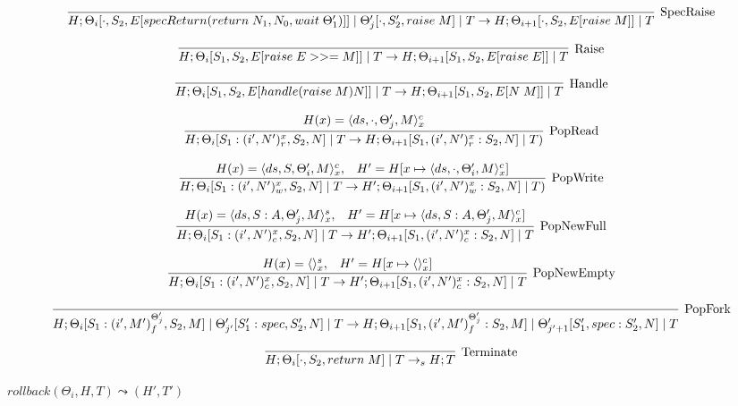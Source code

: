 \documentclass[9pt]{article}
\newcommand\specStep{\rightarrow_{s}}
\newcommand{\eval}[1]{E[#1]}
\begin{document}
\[%
\infer[\text{SpecRaise}]{H; \Theta_i[\cdot, S_2, \eval{specReturn(return \; N_1, N_0, wait \; \Theta_1')}] \; | \; \Theta_j'[\cdot, S_2', raise \; M] \; | \; T \rightarrow H; \Theta_{i+1}[\cdot, S_2, \eval{raise \; M}] \; | \; T}{}
\]

\[%
\infer[\text{Raise}]{H; \Theta_i[S_1, S_2, \eval{raise \; E >>= M}] \; | \; T \rightarrow H; \Theta_{i+1}[S_1, S_2, \eval{raise \; E}] \; | \; T}{}
\]

\[%
\infer[\text{Handle}]{H; \Theta_i[S_1, S_2, \eval{handle (raise \; M) N}] \; | \; T \rightarrow H; \Theta_{i+1}[S_1, S_2, \eval{N \; M}] \; | \; T}{}
\]

\[%
\infer[\text{PopRead}]{H; \Theta_i[S_1 : (i', N')_r^x, S_2, N] \; | \; T \rightarrow H; \Theta_{i+1}[S_1, (i', N')_r^x : S_2, N] \; | \; T)}{H(x) = \langle ds, \cdot, \Theta_j', M\rangle_x^c}
\]

\[%
\infer[\text{PopWrite}]{H; \Theta_i[S_1: (i', N')_w^x, S_2, N] \; | \; T \rightarrow H'; \Theta_{i+1}[S_1, (i', N')_w^x : S_2, N] \; | \; T)}{H(x) = \langle ds, S, \Theta_i', M\rangle_x^c, \;\;\; H' = H[x \mapsto \langle ds, \cdot, \Theta_i', M\rangle_x^c]}
\]

\[%
\infer[\text{PopNewFull}]{H; \Theta_i[S_1 : (i', N')_c^x, S_2, N] \; | \; T \rightarrow H';  \Theta_{i+1}[S_1, (i', N')_c^x : S_2, N] \; | \; T}{H(x) = \langle ds, S:A, \Theta_j', M \rangle_x^s, \;\;\; H' = H[x \mapsto \langle ds, S:A, \Theta_j', M\rangle_x^c]}
\]

\[%
\infer[\text{PopNewEmpty}]{H; \Theta_i[S_1 : (i', N')_c^x, S_2, N] \; | \; T \rightarrow H';  \Theta_{i+1}[S_1, (i', N')_c^x : S_2, N] \; | \; T}{H(x) = \langle \rangle_x^s, \;\;\; H' = H[x \mapsto \langle \rangle_x^c]}
\]

\[%
\infer[\text{PopFork}]{H; \Theta_i[S_1 : (i', M')_f^{\Theta_j'}, S_2, M] \; | \; \Theta_{j'}'[S_1' : spec, S_2', N] \; | \; T \rightarrow H; \Theta_{i+1}[S_1, (i', M')_f^{\Theta_j'} : S_2, M] \; | \; \Theta_{j' + 1}'[S_1', spec : S_2', N] \; | \; T}{}
\]

\[
\infer[\text{Terminate}]{H; \Theta_i[\cdot, S_2, return \; M] \; | \; T \specStep H; T}{}
\]

$\boxed{rollback(\Theta_i, H, T) \leadsto (H' ,T')}$
\end{document}
